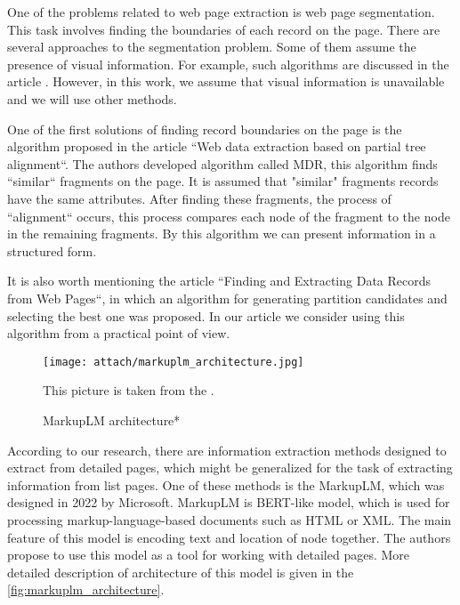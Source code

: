 One of the problems related to web page extraction is web page segmentation. This task involves finding the boundaries of each record on the page. There are several approaches to the segmentation problem. Some of them assume the presence of visual information. For example, such algorithms are discussed in the article \cite{kiesel2021empirical}. However, in this work, we assume that visual information is unavailable and we will use other methods.

One of the first solutions of finding record boundaries on the page is the algorithm proposed in the article ``Web data extraction based on partial tree alignment``\cite{zhai_web_2005}. The authors developed algorithm called MDR, this algorithm finds ``similar`` fragments on the page. It is assumed that "similar" fragments records have the same attributes. After finding these fragments, the process of ``alignment`` occurs, this process compares each node of the fragment to the node in the remaining fragments. By this algorithm we can present information in a structured form.

It is also worth mentioning the article ``Finding and Extracting Data Records from Web Pages``\cite{alvarez_finding_2010}, in which an algorithm for generating partition candidates and selecting the best one was proposed. In our article we consider using this algorithm from a practical point of view.

\begin{figure}
    \centering
    \texttt{[image: attach/markuplm\_architecture.jpg]}
    \caption{MarkupLM architecture*}
    \small* This picture is taken from the \cite{li_markuplm_2022}.
    \label{fig:markuplm_architecture}
\end{figure}

According to our research, there are information extraction methods designed to extract from detailed pages, which might be generalized for the task of extracting information from list pages. One of these methods is the MarkupLM, which was designed in 2022 by Microsoft\cite{li_markuplm_2022}. MarkupLM is BERT-like model, which is used for processing markup-language-based documents such as HTML or XML. The main feature of this model is encoding text and location of node together. The authors propose to use this model as a tool for working with detailed pages. More detailed description of architecture of this model is given in the \autoref{fig:markuplm_architecture}.

